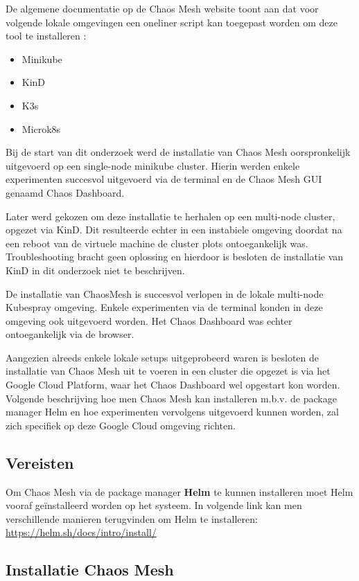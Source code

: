 De algemene documentatie op de Chaos Mesh website toont aan dat voor volgende lokale omgevingen een oneliner script kan toegepast worden om deze tool te installeren \autocite{ChaosMesh2022}: 
\begin{itemize}
    \item Minikube
    \item KinD
    \item K3s
    \item Microk8s
\end{itemize}

Bij de start van dit onderzoek werd de installatie van Chaos Mesh oorspronkelijk uitgevoerd op een single-node minikube cluster. Hierin werden enkele experimenten succesvol uitgevoerd via de terminal en de Chaos Mesh GUI genaamd Chaos Dashboard.

Later werd gekozen om deze installatie te herhalen op een multi-node cluster, opgezet via KinD. Dit resulteerde echter in een instabiele omgeving doordat na een reboot van de virtuele machine de cluster plots ontoegankelijk was. Troubleshooting bracht geen oplossing en hierdoor is besloten de installatie van KinD in dit onderzoek niet te beschrijven.

De installatie van ChaosMesh is succesvol verlopen in de lokale multi-node Kubespray omgeving. Enkele experimenten via de terminal konden in deze omgeving ook uitgevoerd worden. Het Chaos Dashboard was echter ontoegankelijk via de browser.  

Aangezien alreeds enkele lokale setups uitgeprobeerd waren is besloten de installatie van Chaos Mesh uit te voeren in een cluster die opgezet is via het Google Cloud Platform, waar het Chaos Dashboard  wel opgestart kon worden. Volgende beschrijving hoe men Chaos Mesh kan installeren m.b.v. de package manager Helm en hoe experimenten vervolgens uitgevoerd kunnen worden, zal zich specifiek op deze Google Cloud omgeving richten. \autocite{ChaosMesh2022a}

\subsection {Vereisten}

Om Chaos Mesh via de package manager {\bf Helm} te kunnen installeren moet Helm vooraf geïnstalleerd worden op het systeem. In volgende link kan men verschillende manieren terugvinden om Helm te installeren: \url{https://helm.sh/docs/intro/install/}

\subsection{Installatie Chaos Mesh}

